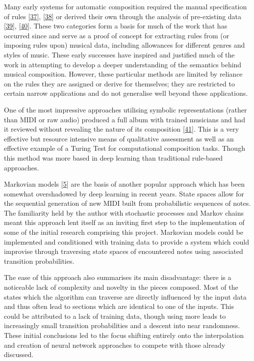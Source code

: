 \documentclass[12pt,]{article}
\begin{document}
Many early systems for automatic composition required the manual
specification of rules
{[}\protect\hyperlink{ref-ebciouglu1988expert}{37}{]},
{[}\protect\hyperlink{ref-cruz1998learning}{38}{]} or derived their own
through the analysis of pre-existing data
{[}\protect\hyperlink{ref-cope1996experiments}{39}{]},
{[}\protect\hyperlink{ref-spangler1998bach}{40}{]}. These two categories
form a basis for much of the work that has occurred since and serve as a
proof of concept for extracting rules from (or imposing rules upon)
musical data, including allowances for different genres and styles of
music. These early successes have inspired and justified much of the
work in attempting to develop a deeper understanding of the semantics
behind musical composition. However, these particular methods are
limited by reliance on the rules they are assigned or derive for
themselves; they are restricted to certain narrow applications and do
not generalise well beyond these applications.

One of the most impressive approaches utilising symbolic representations
(rather than MIDI or raw audio) produced a full album with trained
musicians and had it reviewed without revealing the nature of its
composition {[}\protect\hyperlink{ref-sturm2018let}{41}{]}. This is a
very effective but resource intensive means of qualitative assessment as
well as an effective example of a Turing Test for computational
composition tasks. Though this method was more based in deep learning
than traditional rule-based approaches.

Markovian models {[}\protect\hyperlink{ref-luque2009stochastic}{5}{]}
are the basis of another popular approach which has been somewhat
overshadowed by deep learning in recent years. State spaces allow for
the sequential generation of new MIDI built from probabilistic sequences
of notes. The familiarity held by the author with stochastic processes
and Markov chains meant this approach lent itself as an inviting first
step to the implementation of some of the initial research comprising
this project. Markovian models could be implemented and conditioned with
training data to provide a system which could improvise through
traversing state spaces of encountered notes using associated transition
probabilities.

The ease of this approach also summarises its main disadvantage: there
is a noticeable lack of complexity and novelty in the pieces composed.
Most of the states which the algorithm can traverse are directly
influenced by the input data and thus often lead to sections which are
identical to one of the inputs. This could be attributed to a lack of
training data, though using more leads to increasingly small transition
probabilities and a descent into near randomness. These initial
conclusions led to the focus shifting entirely onto the interpolation
and creation of neural network approaches to compete with those already
discussed.
\end{document}

